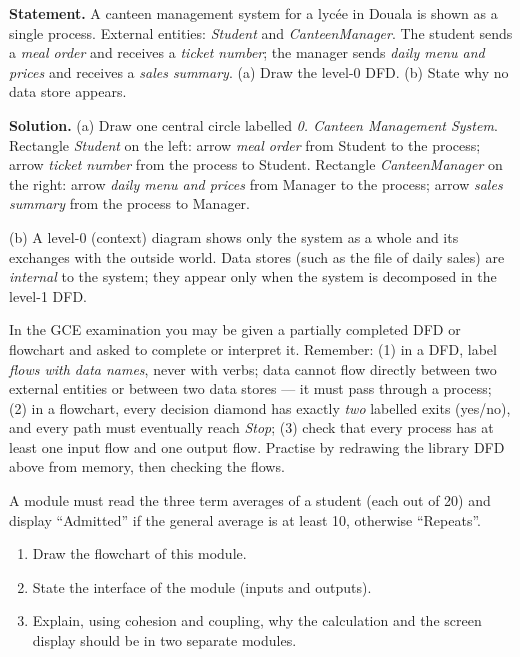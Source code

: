 \documentclass[11pt]{article}
\begin{document}
\begin{exoresolu}
\textbf{Statement.} A canteen management system for a lycée in Douala is shown as a single process. External entities: \emph{Student} and \emph{CanteenManager}. The student sends a \emph{meal order} and receives a \emph{ticket number}; the manager sends \emph{daily menu and prices} and receives a \emph{sales summary}. (a) Draw the level-0 DFD. (b) State why no data store appears.

\tcblower
\textbf{Solution.} (a) Draw one central circle labelled \emph{0. Canteen Management System}. Rectangle \emph{Student} on the left: arrow \emph{meal order} from Student to the process; arrow \emph{ticket number} from the process to Student. Rectangle \emph{CanteenManager} on the right: arrow \emph{daily menu and prices} from Manager to the process; arrow \emph{sales summary} from the process to Manager.

(b) A level-0 (context) diagram shows only the system as a whole and its exchanges with the outside world. Data stores (such as the file of daily sales) are \emph{internal} to the system; they appear only when the system is decomposed in the level-1 DFD.
\end{exoresolu}

\begin{attention}
In the GCE examination you may be given a partially completed DFD or flowchart and asked to complete or interpret it. Remember: (1) in a DFD, label \emph{flows with data names}, never with verbs; data cannot flow directly between two external entities or between two data stores — it must pass through a process; (2) in a flowchart, every decision diamond has exactly \emph{two} labelled exits (yes/no), and every path must eventually reach \emph{Stop}; (3) check that every process has at least one input flow and one output flow. Practise by redrawing the library DFD above from memory, then checking the flows.
\end{attention}

\begin{exercice}
A module must read the three term averages of a student (each out of 20) and display ``Admitted'' if the general average is at least 10, otherwise ``Repeats''.
\begin{enumerate}
\item Draw the flowchart of this module.
\item State the interface of the module (inputs and outputs).
\item Explain, using cohesion and coupling, why the calculation and the screen display should be in two separate modules.
\end{enumerate}
\end{exercice}
\end{document}

